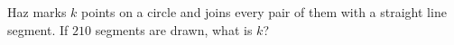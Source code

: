 Haz marks $k$ points on a circle and joins every pair of them with a straight line segment. If $210$ segments are drawn, what is $k$?

